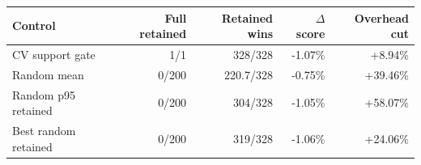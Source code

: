 \begin{tabular}{lrrrr}
\toprule
Control & Full retained & Retained wins & $\Delta$ score & Overhead cut \\
\midrule
CV support gate & 1/1 & 328/328 & -1.07\% & +8.94\% \\
Random mean & 0/200 & 220.7/328 & -0.75\% & +39.46\% \\
Random p95 retained & 0/200 & 304/328 & -1.05\% & +58.07\% \\
Best random retained & 0/200 & 319/328 & -1.06\% & +24.06\% \\
\bottomrule
\end{tabular}
